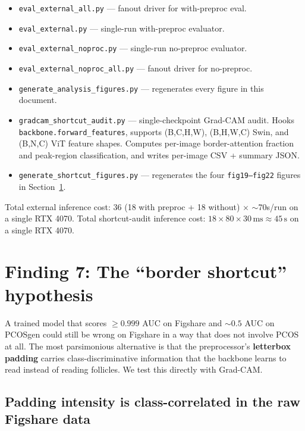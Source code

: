 \documentclass[11pt]{article}
\begin{document}
\begin{itemize}
  \item \texttt{eval\_external\_all.py} --- fanout driver for with-preproc eval.
  \item \texttt{eval\_external.py} --- single-run with-preproc evaluator.
  \item \texttt{eval\_external\_noproc.py} --- single-run no-preproc evaluator.
  \item \texttt{eval\_external\_noproc\_all.py} --- fanout driver for no-preproc.
  \item \texttt{generate\_analysis\_figures.py} --- regenerates every figure
        in this document.
  \item \texttt{gradcam\_shortcut\_audit.py} --- single-checkpoint Grad-CAM
        audit. Hooks \texttt{backbone.forward\_features}, supports
        (B,C,H,W), (B,H,W,C) Swin, and (B,N,C) ViT feature shapes.
        Computes per-image border-attention fraction and peak-region
        classification, and writes per-image CSV + summary JSON.
  \item \texttt{generate\_shortcut\_figures.py} --- regenerates the four
        \texttt{fig19--fig22} figures in Section~\ref{sec:shortcut}.
\end{itemize}

Total external inference cost: 36 (18 with preproc + 18 without) $\times$
$\sim$70s/run on a single RTX 4070. Total shortcut-audit inference cost:
$18 \times 80 \times 30\,\mathrm{ms} \approx 45\,\mathrm{s}$ on a single
RTX 4070.

\section{Finding 7: The ``border shortcut'' hypothesis}
\label{sec:shortcut}

A trained model that scores $\geq 0.999$ AUC on Figshare and $\sim 0.5$ AUC
on PCOSgen could still be wrong on Figshare in a way that does not involve
PCOS at all. The most parsimonious alternative is that the preprocessor's
\textbf{letterbox padding} carries class-discriminative information that the
backbone learns to read instead of reading follicles. We test this directly
with Grad-CAM.

\subsection{Padding intensity is class-correlated in the raw Figshare data}
\end{document}
